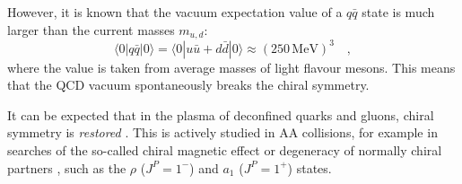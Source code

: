 However, it is known that the vacuum expectation value of a $q\bar{q}$ state is much larger than the current masses $m_{u,d}$:
\begin{equation}
\langle 0 | q \bar{q} | 0 \rangle = \langle 0 | u\bar{u} + d \bar{d} | 0 \rangle \approx (250 \, \mathrm{MeV} )^3 \quad ,
\end{equation}
where the value is taken from average masses of light flavour mesons. This means that the QCD vacuum spontaneously breaks the chiral symmetry. \cite{sazdjianIntroductionChiralSymmetry2017}

It can be expected that in the plasma of deconfined quarks and gluons, chiral symmetry is \textit{restored} \cite{gottliebEstimatingChiralsymmetryRestoration1987, xuChiralSymmetryRestoration2023}. This is actively studied in AA collisions, for example in searches of the so-called chiral magnetic effect \cite{starcollaborationSearchChiralMagnetic2021} or degeneracy of normally chiral partners \cite{hohlerRmesonMeltingCompatible2014}, such as the $\rho$ ($J^P=1^-$) and $a_1$ ($J^P=1^+$) states.

%
